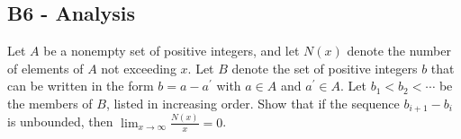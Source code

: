 \documentclass[11pt]{scrartcl}
\newcommand{\<}{\langle}
\renewcommand{\>}{\rangle}
\begin{document}
\subsection{B6 - Analysis} 
Let $A$ be a nonempty set of positive integers, and let $N(x)$ denote the number of elements of $A$ not exceeding $x$. Let $B$ denote the set of positive integers $b$ that can be written in the form $b=a-a^{\prime}$ with $a\in A$ and $a^{\prime}\in A$. Let $b_1<b_2<\cdots$ be the members of $B$, listed in increasing order. Show that if the sequence $b_{i+1}-b_i$ is unbounded, then $\lim_{x\to \infty}\frac{N(x)}{x}=0$.
%
%
%
%
\end{document}
